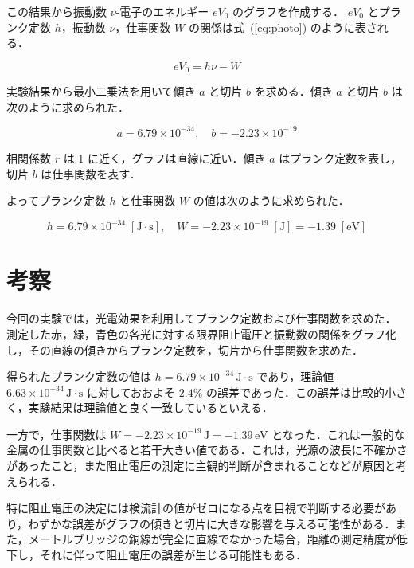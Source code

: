 \documentclass[a4paper,11pt,dvipdfmx]{jsarticle}
\begin{document}
この結果から振動数 $\nu$-電子のエネルギー $eV_0$ のグラフを作成する．
$eV_0$ とプランク定数 $h$，振動数 $\nu$，仕事関数 $W$ の関係は式~(\ref{eq:photo}) のように表される．

\begin{equation}
eV_0 = h\nu - W
\label{eq:photo}
\end{equation}

実験結果から最小二乗法を用いて傾き $a$ と切片 $b$ を求める．傾き $a$ と切片 $b$ は次のように求められた．

\begin{equation}
a = 6.79 \times 10^{-34}, \quad b = -2.23 \times 10^{-19}
\end{equation}

相関係数 $r$ は 1 に近く，グラフは直線に近い．傾き $a$ はプランク定数を表し，切片 $b$ は仕事関数を表す．

よってプランク定数 $h$ と仕事関数 $W$ の値は次のように求められた．

\begin{equation}
h = 6.79 \times 10^{-34} \;[\mathrm{J \cdot s}], \quad 
W = -2.23 \times 10^{-19} \;\mathrm{[J]} = -1.39 \;\mathrm{[eV]}
\label{eq:result}
\end{equation}

\section{考察}
今回の実験では，光電効果を利用してプランク定数および仕事関数を求めた．
測定した赤，緑，青色の各光に対する限界阻止電圧と振動数の関係をグラフ化し，その直線の傾きからプランク定数を，切片から仕事関数を求めた．

得られたプランク定数の値は $h = 6.79 \times 10^{-34}\,\mathrm{J \cdot s}$ であり，理論値 $6.63 \times 10^{-34}\,\mathrm{J \cdot s}$ に対しておおよそ $2.4\%$ の誤差であった．この誤差は比較的小さく，実験結果は理論値と良く一致しているといえる．

一方で，仕事関数は $W = -2.23 \times 10^{-19}\,\mathrm{J} = -1.39\,\mathrm{eV}$ となった．これは一般的な金属の仕事関数と比べると若干大きい値である．これは，光源の波長に不確かさがあったこと，また阻止電圧の測定に主観的判断が含まれることなどが原因と考えられる．

特に阻止電圧の決定には検流計の値がゼロになる点を目視で判断する必要があり，わずかな誤差がグラフの傾きと切片に大きな影響を与える可能性がある．また，メートルブリッジの銅線が完全に直線でなかった場合，距離の測定精度が低下し，それに伴って阻止電圧の誤差が生じる可能性もある．
\end{document}
